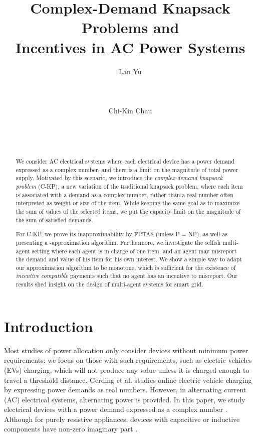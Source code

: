 \documentclass{aamas2013}
\title{Complex-Demand Knapsack Problems and \\Incentives in AC Power Systems}
\author{
\alignauthor
Lan Yu\\
			 \affaddr{Division of Mathematical Sciences}\\
			 \affaddr{School of Physical and Mathematical Sciences}\\
       \affaddr{Nanyang Technological University, Singapore}\\
       \email{yula0001@ntu.edu.sg}
\alignauthor Chi-Kin Chau\\
			 \affaddr{Computing and Information Science}\\
       \affaddr{Masdar Institute of Science and Technology}\\
       \affaddr{Abu Dhabi,UAE}\\
       \email{ckchau@masdar.ac.ae}
}
\begin{document}
\maketitle



\begin{abstract}
We consider AC electrical systems where each electrical device has a power demand expressed as a complex number, and there is a limit on the magnitude of total power supply.  Motivated by this scenario, we introduce the {\em complex-demand knapsack problem} ({\sc C-KP}), a new variation of the traditional knapsack problem, where each item is associated with a demand as a complex number, rather than a real number often interpreted as weight or size of the item.  While keeping the same goal as to maximize the sum of values of the selected items, we put the capacity limit on the magnitude of the sum of satisfied demands.

For {\sc C-KP}, we prove its inapproximability by FPTAS (unless P = NP), as well as presenting a -approximation algorithm.  Furthermore, we investigate the selfish multi-agent setting where each agent is in charge of one item, and an agent may misreport the demand and value of his item for his own interest.  We show a simple way to adapt our approximation algorithm to be monotone, which is sufficient for the existence of {\em incentive compatible} payments such that no agent has an incentive to misreport.  Our results shed insight on the design of multi-agent systems for smart grid.
\end{abstract}




\section{Introduction}\label{sec:introduction}
\noindent
Most studies of power allocation only consider devices without minimum power requirements; we focus on those with such requirements, such as electric vehicles (EVs) charging, which will not produce any value unless it is charged enough to travel a threshold distance.  Gerding et al. \cite{gerding2011online} studies online electric vehicle charging by expressing power demands as real numbers.  However, in alternating current (AC) electrical systems, alternating power is provided.  In this paper, we study electrical devices with a power demand expressed as a complex number .  Although  for purely resistive appliances; devices with capacitive or inductive components have non-zero imaginary part  \cite{GS94power}.  
\end{document}
